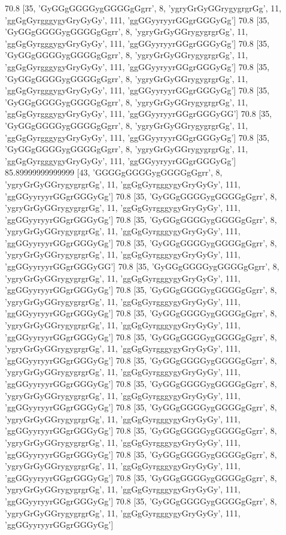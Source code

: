 70.8 [35, 'GyGGgGGGGygGGGGgGgrr', 8, 'ygryGrGyGGrygygrgrGg', 11, 'ggGgGyrgggygyGryGyGy', 111, 'ggGGyyryyrGGgrGGGyGg']
70.8 [35, 'GyGGgGGGGygGGGGgGgrr', 8, 'ygryGrGyGGrygygrgrGg', 11, 'ggGgGyrgggygyGryGyGy', 111, 'ggGGyyryyrGGgrGGGyGg']
70.8 [35, 'GyGGgGGGGygGGGGgGgrr', 8, 'ygryGrGyGGrygygrgrGg', 11, 'ggGgGyrgggygyGryGyGy', 111, 'ggGGyyryyrGGgrGGGyGg']
70.8 [35, 'GyGGgGGGGygGGGGgGgrr', 8, 'ygryGrGyGGrygygrgrGg', 11, 'ggGgGyrgggygyGryGyGy', 111, 'ggGGyyryyrGGgrGGGyGg']
70.8 [35, 'GyGGgGGGGygGGGGgGgrr', 8, 'ygryGrGyGGrygygrgrGg', 11, 'ggGgGyrgggygyGryGyGy', 111, 'ggGGyyryyrGGgrGGGyGG']
70.8 [35, 'GyGGgGGGGygGGGGgGgrr', 8, 'ygryGrGyGGrygygrgrGg', 11, 'ggGgGyrgggygyGryGyGy', 111, 'ggGGyyryyrGGgrGGGyGg']
70.8 [35, 'GyGGgGGGGygGGGGgGgrr', 8, 'ygryGrGyGGrygygrgrGg', 11, 'ggGgGyrgggygyGryGyGy', 111, 'ggGGyyryyrGGgrGGGyGg']
85.89999999999999 [43, 'GGGGgGGGGygGGGGgGgrr', 8, 'ygryGrGyGGrygygrgrGg', 11, 'ggGgGyrgggygyGryGyGy', 111, 'ggGGyyryyrGGgrGGGyGg']
70.8 [35, 'GyGGgGGGGygGGGGgGgrr', 8, 'ygryGrGyGGrygygrgrGg', 11, 'ggGgGyrgggygyGryGyGy', 111, 'ggGGyyryyrGGgrGGGyGg']
70.8 [35, 'GyGGgGGGGygGGGGgGgrr', 8, 'ygryGrGyGGrygygrgrGg', 11, 'ggGgGyrgggygyGryGyGy', 111, 'ggGGyyryyrGGgrGGGyGg']
70.8 [35, 'GyGGgGGGGygGGGGgGgrr', 8, 'ygryGrGyGGrygygrgrGg', 11, 'ggGgGyrgggygyGryGyGy', 111, 'ggGGyyryyrGGgrGGGyGG']
70.8 [35, 'GyGGgGGGGygGGGGgGgrr', 8, 'ygryGrGyGGrygygrgrGg', 11, 'ggGgGyrgggygyGryGyGy', 111, 'ggGGyyryyrGGgrGGGyGg']
70.8 [35, 'GyGGgGGGGygGGGGgGgrr', 8, 'ygryGrGyGGrygygrgrGg', 11, 'ggGgGyrgggygyGryGyGy', 111, 'ggGGyyryyrGGgrGGGyGg']
70.8 [35, 'GyGGgGGGGygGGGGgGgrr', 8, 'ygryGrGyGGrygygrgrGg', 11, 'ggGgGyrgggygyGryGyGy', 111, 'ggGGyyryyrGGgrGGGyGg']
70.8 [35, 'GyGGgGGGGygGGGGgGgrr', 8, 'ygryGrGyGGrygygrgrGg', 11, 'ggGgGyrgggygyGryGyGy', 111, 'ggGGyyryyrGGgrGGGyGg']
70.8 [35, 'GyGGgGGGGygGGGGgGgrr', 8, 'ygryGrGyGGrygygrgrGg', 11, 'ggGgGyrgggygyGryGyGy', 111, 'ggGGyyryyrGGgrGGGyGg']
70.8 [35, 'GyGGgGGGGygGGGGgGgrr', 8, 'ygryGrGyGGrygygrgrGg', 11, 'ggGgGyrgggygyGryGyGy', 111, 'ggGGyyryyrGGgrGGGyGg']
70.8 [35, 'GyGGgGGGGygGGGGgGgrr', 8, 'ygryGrGyGGrygygrgrGg', 11, 'ggGgGyrgggygyGryGyGy', 111, 'ggGGyyryyrGGgrGGGyGg']
70.8 [35, 'GyGGgGGGGygGGGGgGgrr', 8, 'ygryGrGyGGrygygrgrGg', 11, 'ggGgGyrgggygyGryGyGy', 111, 'ggGGyyryyrGGgrGGGyGg']
70.8 [35, 'GyGGgGGGGygGGGGgGgrr', 8, 'ygryGrGyGGrygygrgrGg', 11, 'ggGgGyrgggygyGryGyGy', 111, 'ggGGyyryyrGGgrGGGyGg']
70.8 [35, 'GyGGgGGGGygGGGGgGgrr', 8, 'ygryGrGyGGrygygrgrGg', 11, 'ggGgGyrgggygyGryGyGy', 111, 'ggGGyyryyrGGgrGGGyGg']
70.8 [35, 'GyGGgGGGGygGGGGgGgrr', 8, 'ygryGrGyGGrygygrgrGg', 11, 'ggGgGyrgggygyGryGyGy', 111, 'ggGGyyryyrGGgrGGGyGg']
